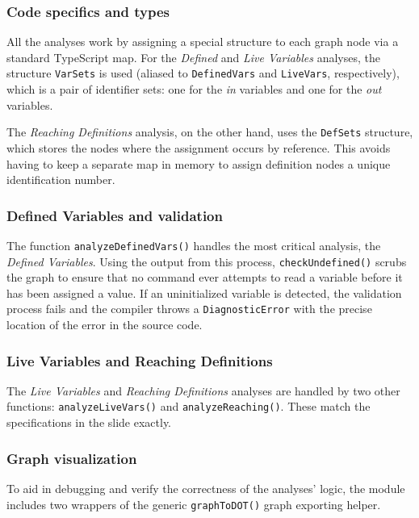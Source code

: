 \documentclass[12pt]{article}
\newcommand{\Code}[1]{\texttt{#1}}
\begin{document}
\subsubsection{Code specifics and types}

All the analyses work by assigning a special structure to each graph node via a
standard TypeScript map. For the \textit{Defined} and \textit{Live Variables}
analyses, the structure \Code{VarSets} is used (aliased to \Code{DefinedVars}
and \Code{LiveVars}, respectively), which is a pair of identifier sets: one for
the \textit{in} variables and one for the \textit{out} variables.

The \textit{Reaching Definitions} analysis, on the other hand, uses the
\Code{DefSets} structure, which stores the nodes where the assignment occurs by
reference. This avoids having to keep a separate map in memory to assign
definition nodes a unique identification number.

\subsubsection{Defined Variables and validation}

The function \Code{analyzeDefinedVars()} handles the most critical analysis, the
\textit{Defined Variables}. Using the output from this process,
\Code{checkUndefined()} scrubs the graph to ensure that no command ever attempts
to read a variable before it has been assigned a value. If an uninitialized
variable is detected, the validation process fails and the compiler throws a
\Code{DiagnosticError} with the precise location of the error in the source
code.

\subsubsection{Live Variables and Reaching Definitions}

The \textit{Live Variables} and \textit{Reaching Definitions} analyses are
handled by two other functions: \Code{analyzeLiveVars()} and
\Code{analyzeReaching()}. These match the specifications in the slide exactly.

\subsubsection{Graph visualization}

To aid in debugging and verify the correctness of the analyses' logic, the
module includes two wrappers of the generic \Code{graphToDOT()} graph exporting
helper.
\end{document}

